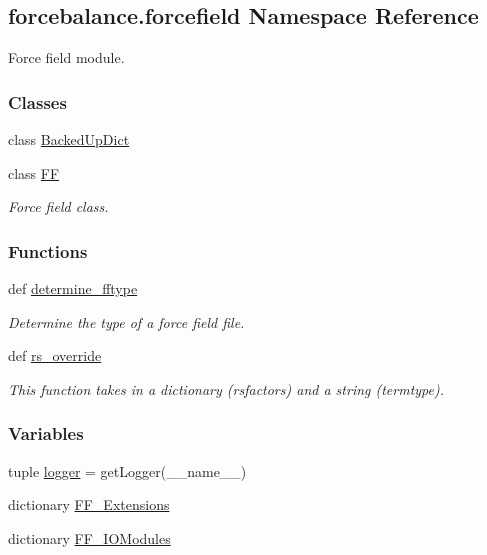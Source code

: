\hypertarget{namespaceforcebalance_1_1forcefield}{\subsection{forcebalance.\-forcefield Namespace Reference}
\label{namespaceforcebalance_1_1forcefield}
}


Force field module.  


\subsubsection*{Classes}
\begin{DoxyCompactItemize}
\item 
class \hyperlink{classforcebalance_1_1forcefield_1_1BackedUpDict}{Backed\-Up\-Dict}
\item 
class \hyperlink{classforcebalance_1_1forcefield_1_1FF}{F\-F}
\begin{DoxyCompactList}\small\item\em Force field class. \end{DoxyCompactList}\end{DoxyCompactItemize}
\subsubsection*{Functions}
\begin{DoxyCompactItemize}
\item 
def \hyperlink{namespaceforcebalance_1_1forcefield_a99c9997d5158a04be089f291bd6f99bd}{determine\-\_\-fftype}
\begin{DoxyCompactList}\small\item\em Determine the type of a force field file. \end{DoxyCompactList}\item 
def \hyperlink{namespaceforcebalance_1_1forcefield_ab1a855bace20dd5e45928467e2a133f1}{rs\-\_\-override}
\begin{DoxyCompactList}\small\item\em This function takes in a dictionary (rsfactors) and a string (termtype). \end{DoxyCompactList}\end{DoxyCompactItemize}
\subsubsection*{Variables}
\begin{DoxyCompactItemize}
\item 
tuple \hyperlink{namespaceforcebalance_1_1forcefield_ab770be419e9b4522779dc3dfb1d7d019}{logger} = get\-Logger(\-\_\-\-\_\-name\-\_\-\-\_\-)
\item 
dictionary \hyperlink{namespaceforcebalance_1_1forcefield_abc5e12aa78c5742f028b954ede086c51}{F\-F\-\_\-\-Extensions}
\item 
dictionary \hyperlink{namespaceforcebalance_1_1forcefield_a3beac9806e0438b79b9ae60a47c7b131}{F\-F\-\_\-\-I\-O\-Modules}
\end{DoxyCompactItemize}


